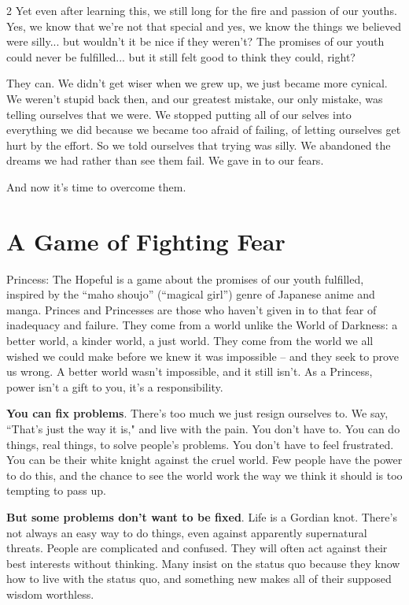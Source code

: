 \begin{multicols}{2}
Yet even after learning this, we still long for the fire and passion of our youths. Yes, we know that we're not that special and yes, we know the things we believed were silly... but wouldn't it be nice if they weren't? The promises of our youth could never be fulfilled... but it still felt good to think they could, right?

They can. We didn't get wiser when we grew up, we just became more cynical. We weren't stupid back then, and our greatest mistake, our only mistake, was telling ourselves that we were. We stopped putting all of our selves into everything we did because we became too afraid of failing, of letting ourselves get hurt by the effort. So we told ourselves that trying was silly. We abandoned the dreams we had rather than see them fail. We gave in to our fears.

And now it's time to overcome them.

\section*{A Game of Fighting Fear}

Princess: The Hopeful is a game about the promises of our youth fulfilled, inspired by the “maho shoujo” (“magical girl”) genre of Japanese anime and manga. Princes and Princesses are those who haven't given in to that fear of inadequacy and failure. They come from a world unlike the World of Darkness: a better world, a kinder world, a just world. They come from the world we all wished we could make before we knew it was impossible – and they seek to prove us wrong. A better world wasn't impossible, and it still isn't. As a Princess, power isn't a gift to you, it's a responsibility.

\textbf{You can fix problems}. There's too much we just resign ourselves to. We say, \textquotedblleft That's just the way it is," and live with the pain. You don't have to. You can do things, real things, to solve people's problems. You don't have to feel frustrated. You can be their white knight against the cruel world. Few people have the power to do this, and the chance to see the world work the way we think it should is too tempting to pass up.

\textbf{But some problems don't want to be fixed}. Life is a Gordian knot. There's not always an easy way to do things, even against apparently supernatural threats. People are complicated and confused. They will often act against their best interests without thinking. Many insist on the status quo because they know how to live with the status quo, and something new makes all of their supposed wisdom worthless.


\end{multicols}
